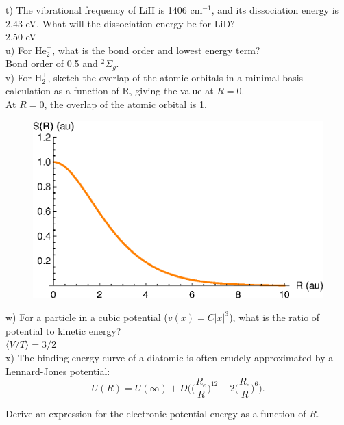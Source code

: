 \documentclass{article}
\begin{document}
\noindent t) The vibrational frequency of LiH is 1406 cm$^{-1}$, and its dissociation
energy is 2.43 eV. What will the dissociation energy be for LiD?
\\

{\color{blue} 2.50 eV}
\\

\noindent u) For He$_2^+$, what is the bond order and lowest energy term?
\\

{\color{blue} Bond order of 0.5 and $^2\Sigma_g$.}
\\

\noindent v) For H$_2^+$, sketch the overlap of the atomic orbitals in a minimal basis
calculation as a function of R, giving the value at $R=0$.
\\

{\color{blue} At $R=0$, the overlap of the atomic orbital is 1.}
\begin{figure}[H]
  \centering
  \includegraphics[scale=0.75]{h2.eps}
  \label{fig:overlap}
\end{figure}

\noindent w) For a particle in a cubic potential ($v(x) = C|x|^3$), what is the ratio
of potential to kinetic energy?
\\

{\color{blue} $\langle V/T \rangle = 3/2$}
\\

\noindent x) The binding energy curve of a diatomic is often crudely approximated by a
Lennard-Jones potential:
\begin{equation*}
  U(R) = U(\infty) +D\Bigg(\Bigg(\frac{R_e}{R}\Bigg)^{12} - 2\Bigg(\frac{R_e}{R}\Bigg)^6\Bigg).
\end{equation*}

Derive an expression for the electronic potential energy as a function of $R$.
\end{document}
